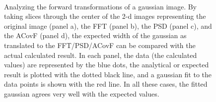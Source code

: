 \documentclass[11pt,preprint]{aastex}
\begin{document}
\begin{figure}[htbp]
\centering
{}
 \\
\caption{{\small
Analyzing the forward transformations of a gaussian image. By taking slices through the center of the 2-d images representing the original image (panel a), the FFT (panel b), the PSD (panel c), and the ACovF (panel d), the expected width of the gaussian as translated to the FFT/PSD/ACovF can be compared with the actual calculated result. In each panel, the data (the calculated values) are represented by the blue dots, the analytical or expected result is plotted with the dotted black line, and a gaussian fit to the data points is shown with the red line. In all these cases, the fitted gaussian agrees very well with the expected values.}}
\label{fig:gauss_slices}
\end{figure}
\end{document}
